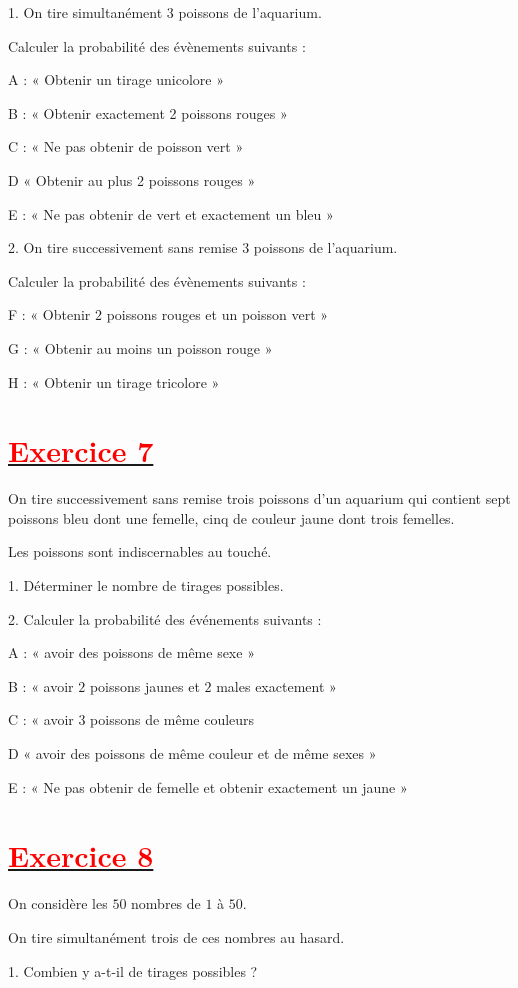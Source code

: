 \documentclass[12pt]{article}
\begin{document}
1. On tire simultanément $3$ poissons de l'aquarium.


Calculer la probabilité des évènements suivants :

A : « Obtenir un tirage unicolore » 

B : « Obtenir exactement 2 poissons rouges »

C : « Ne pas obtenir de poisson vert » 

D « Obtenir au plus 2 poissons rouges »

E : « Ne pas obtenir de vert et exactement un bleu »

2. On tire successivement sans remise 3 poissons de l'aquarium.

Calculer la probabilité des évènements suivants :

F : « Obtenir $2$ poissons rouges et un poisson vert » 

G : « Obtenir au moins un poisson rouge »

H : « Obtenir un tirage tricolore »
\section*{\underline{\textbf{\textcolor{red}{Exercice 7}}}}
On tire successivement sans remise trois poissons d'un aquarium qui contient sept poissons bleu dont une femelle, cinq de couleur jaune dont trois femelles.

Les poissons sont indiscernables au touché.

1. Déterminer le nombre de tirages possibles.

2. Calculer la probabilité des événements suivants :

A : « avoir des poissons de même sexe » 

B : « avoir $2$ poissons jaunes et $2$ males exactement »

C : « avoir $3$ poissons de même couleurs

D « avoir des poissons de même couleur et de même sexes »

E : « Ne pas obtenir de femelle et obtenir exactement un jaune »
\section*{\underline{\textbf{\textcolor{red}{Exercice 8}}}}
On considère les $50$ nombres de $1$ à $50.$

On tire simultanément trois de ces nombres au hasard.

1. Combien y a-t-il de tirages possibles ?
\end{document}

